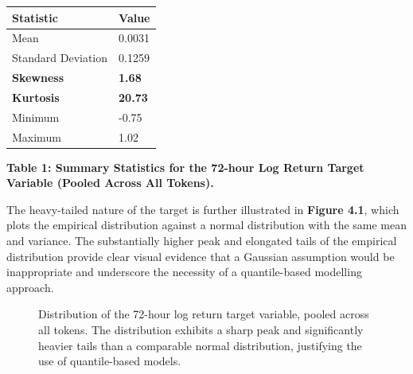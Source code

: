 \documentclass[
  a4paper,
  DIV=11,
  numbers=noendperiod]{scrreprt}
\begin{document}
\begin{longtable}[]{@{}ll@{}}
\toprule\noalign{}
Statistic & Value \\
\midrule\noalign{}
\endhead
\bottomrule\noalign{}
\endlastfoot
Mean & 0.0031 \\
Standard Deviation & 0.1259 \\
\textbf{Skewness} & \textbf{1.68} \\
\textbf{Kurtosis} & \textbf{20.73} \\
Minimum & -0.75 \\
Maximum & 1.02 \\
\end{longtable}

\textbf{Table 1: Summary Statistics for the 72-hour Log Return Target
Variable (Pooled Across All Tokens).}

The heavy-tailed nature of the target is further illustrated in
\textbf{Figure 4.1}, which plots the empirical distribution against a
normal distribution with the same mean and variance. The substantially
higher peak and elongated tails of the empirical distribution provide
clear visual evidence that a Gaussian assumption would be inappropriate
and underscore the necessity of a quantile-based modelling approach.

\begin{figure}


\caption{\label{fig-return-dist}Distribution of the 72-hour log return
target variable, pooled across all tokens. The distribution exhibits a
sharp peak and significantly heavier tails than a comparable normal
distribution, justifying the use of quantile-based models.}

\end{figure}%
\end{document}
